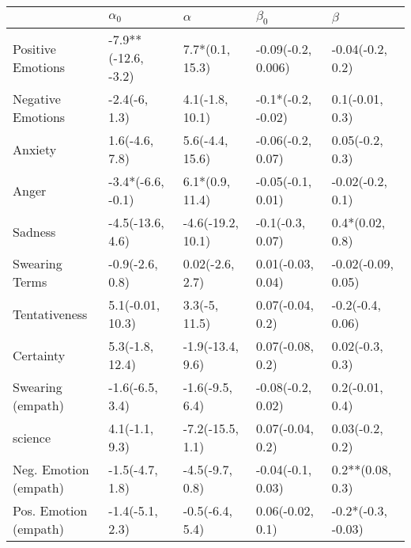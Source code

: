 \begin{tabular}{lllll}
\toprule
{} &           $\alpha_0$ &           $\alpha$ &           $\beta_0$ &             $\beta$ \\
\midrule
Positive Emotions     &  -7.9**(-12.6, -3.2) &    7.7*(0.1, 15.3) &  -0.09(-0.2, 0.006) &    -0.04(-0.2, 0.2) \\
Negative Emotions     &        -2.4(-6, 1.3) &    4.1(-1.8, 10.1) &  -0.1*(-0.2, -0.02) &     0.1(-0.01, 0.3) \\
Anxiety               &       1.6(-4.6, 7.8) &    5.6(-4.4, 15.6) &   -0.06(-0.2, 0.07) &     0.05(-0.2, 0.3) \\
Anger                 &    -3.4*(-6.6, -0.1) &    6.1*(0.9, 11.4) &   -0.05(-0.1, 0.01) &    -0.02(-0.2, 0.1) \\
Sadness               &     -4.5(-13.6, 4.6) &  -4.6(-19.2, 10.1) &    -0.1(-0.3, 0.07) &     0.4*(0.02, 0.8) \\
Swearing Terms        &      -0.9(-2.6, 0.8) &    0.02(-2.6, 2.7) &   0.01(-0.03, 0.04) &  -0.02(-0.09, 0.05) \\
Tentativeness         &     5.1(-0.01, 10.3) &      3.3(-5, 11.5) &    0.07(-0.04, 0.2) &    -0.2(-0.4, 0.06) \\
Certainty             &      5.3(-1.8, 12.4) &   -1.9(-13.4, 9.6) &    0.07(-0.08, 0.2) &     0.02(-0.3, 0.3) \\
Swearing (empath)     &      -1.6(-6.5, 3.4) &    -1.6(-9.5, 6.4) &   -0.08(-0.2, 0.02) &     0.2(-0.01, 0.4) \\
science               &       4.1(-1.1, 9.3) &   -7.2(-15.5, 1.1) &    0.07(-0.04, 0.2) &     0.03(-0.2, 0.2) \\
Neg. Emotion (empath) &      -1.5(-4.7, 1.8) &    -4.5(-9.7, 0.8) &   -0.04(-0.1, 0.03) &    0.2**(0.08, 0.3) \\
Pos. Emotion (empath) &      -1.4(-5.1, 2.3) &    -0.5(-6.4, 5.4) &    0.06(-0.02, 0.1) &  -0.2*(-0.3, -0.03) \\
\bottomrule
\end{tabular}
